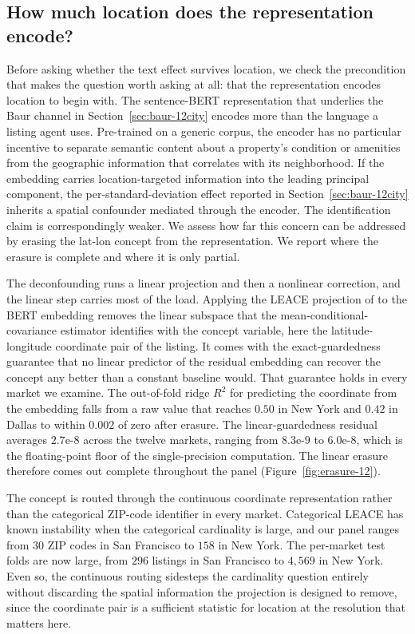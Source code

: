 
\subsection{How much location does the representation encode?}
\label{sec:leace-12}

Before asking whether the text effect survives location, we check the
precondition that makes the question worth asking at all: that the representation
encodes location to begin with. The sentence-BERT representation that underlies
the Baur channel in Section~\ref{sec:baur-12city} encodes more than the language
a listing agent uses. Pre-trained on a generic corpus, the encoder has no particular incentive
to separate semantic content about a property's condition or amenities from the
geographic information that correlates with its neighborhood. If the embedding
carries location-targeted information into the leading principal component, the
per-standard-deviation effect reported in Section~\ref{sec:baur-12city} inherits
a spatial confounder mediated through the encoder. The identification claim
is correspondingly weaker. We assess how far this concern can be addressed by
erasing the lat-lon concept from the representation. We report where the erasure
is complete and where it is only partial.

The deconfounding runs a linear projection and then a nonlinear correction, and
the linear step carries most of the load. Applying the LEACE projection of
\citet{belrose2023leace} to the BERT embedding removes the linear subspace that
the mean-conditional-covariance estimator identifies with the concept variable,
here the latitude-longitude coordinate pair of the listing. It comes with the
exact-guardedness guarantee that no linear predictor of the residual embedding can
recover the concept any better than a constant baseline would. That guarantee
holds in every market we examine. The out-of-fold ridge $R^2$ for predicting
the coordinate from the embedding falls from a raw value that reaches $0.50$ in
New York and $0.42$ in Dallas to within $0.002$ of zero after erasure. The
linear-guardedness residual averages $2.7\text{e-}8$ across the twelve markets,
ranging from $8.3\text{e-}9$ to $6.0\text{e-}8$, which is the floating-point floor
of the single-precision computation. The linear erasure therefore comes out complete
throughout the panel (Figure~\ref{fig:erasure-12}).

The concept is routed through the continuous coordinate representation rather
than the categorical ZIP-code identifier in every market. Categorical LEACE has
known instability when the categorical cardinality is large, and our panel ranges
from $30$ ZIP codes in San Francisco to $158$ in New York. The per-market test
folds are now large, from $296$ listings in San Francisco to
$4{,}569$ in New York. Even so, the continuous routing sidesteps the cardinality question
entirely without discarding the spatial information the projection is designed to
remove, since the coordinate pair is a sufficient statistic for location at the
resolution that matters here.

